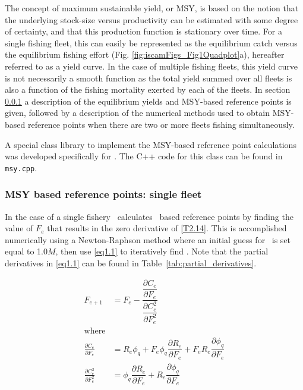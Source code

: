 The concept of maximum sustainable yield, or MSY, is based on the notion that the underlying stock-size versus productivity can be estimated with some degree of certainty, and that this production function is stationary over time.  For a single fishing fleet, this can easily be represented as the equilibrium catch versus the equilibrium fishing effort (Fig. \ref{fig:iscamFigs_Fig1Quadplot}a), hereafter referred to as a yield curve. In the case of multiple fishing fleets, this yield curve  is not necessarily a smooth function as the total yield summed over all fleets is also a function of the fishing mortality exerted by each of the fleets.  In section \ref{ssub:msy_based_reference_points} a description of the equilibrium yields and MSY-based reference points is given, followed by a description of the numerical methods used to obtain MSY-based reference points when there are two or more fleets fishing simultaneously.

A special class library to implement the MSY-based reference point calculations was developed specifically for \iscam.  The C++ code for this class can be found in \texttt{msy.cpp}.


\subsubsection{MSY based reference points: single fleet} %
\label{ssub:msy_based_reference_points}



In the case of a single fishery \iscam\ calculates \fmsy\ based reference points by finding the value of $F_e$ that results in the zero derivative of \eqref{T2.14}.  This is accomplished numerically using a Newton-Raphson method where an initial guess for \fmsy\ is set equal to 1.0$M$, then use \eqref{eq1.1} to iteratively find \fmsy.  Note that the partial derivatives in \eqref{eq1.1} can be found in Table~\ref{tab:partial_derivatives}.

\begin{align}\label{eq1.1}
    F_{e+1}&=F_e - 
    \dfrac{ \dfrac{\partial C_e}{\partial F_e}}
    { \dfrac{\partial C_e^2}{\partial F_e^2}}\\
    \mbox{where}\nonumber\\
     \frac{\partial C_e}{\partial F_e} &=
    R_e \phi_q
    + F_e \phi_q \dfrac{\partial R_e}{\partial F_e}
    + F_e R_e \dfrac{\partial \phi_q}{\partial F_e} \nonumber\\
    \frac{\partial C_e^2}{\partial F_e^2} &=
    \phi_q \dfrac{\partial R_e}{\partial F_e}
   +  R_e \dfrac{\partial \phi_q}{\partial F_e}\nonumber
\end{align}

